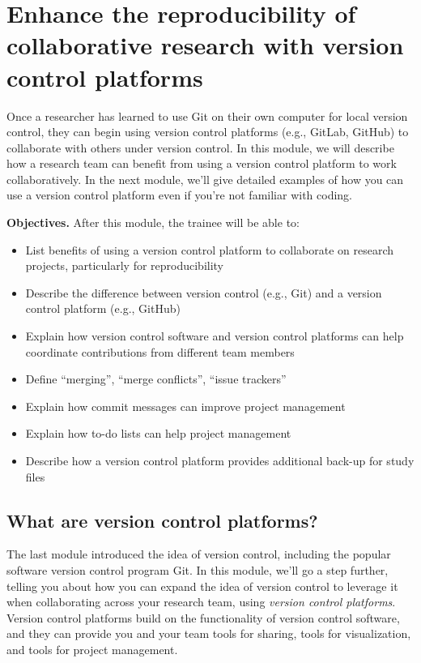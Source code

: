 \documentclass[]{tufte-book}
\providecommand{\tightlist}{%
  \setlength{\itemsep}{0pt}\setlength{\parskip}{0pt}}
\begin{document}
\section{Enhance the reproducibility of collaborative research with version control platforms}\label{module10}

Once a researcher has learned to use Git on their own computer for local version
control, they can begin using version control platforms (e.g., GitLab, GitHub)
to collaborate with others under version control. In this module, we will
describe how a research team can benefit from using a version control platform
to work collaboratively. In the next module, we'll give detailed examples
of how you can use a version control platform even if you're not familiar with
coding.

\textbf{Objectives.} After this module, the trainee will be able to:

\begin{itemize}
\tightlist
\item
  List benefits of using a version control platform to collaborate
  on research projects, particularly for reproducibility
\item
  Describe the difference between version control (e.g., Git) and
  a version control platform (e.g., GitHub)
\item
  Explain how version control software and version control platforms can
  help coordinate contributions from different team members
\item
  Define ``merging'', ``merge conflicts'', ``issue trackers''
\item
  Explain how commit messages can improve project management
\item
  Explain how to-do lists can help project management
\item
  Describe how a version control platform provides additional back-up for
  study files
\end{itemize}

\subsection{What are version control platforms?}\label{what-are-version-control-platforms}

The last module introduced the idea of version control, including the popular
software version control program Git. In this module, we'll go a
step further, telling you about how you can expand the idea of version control
to leverage it when collaborating across your research team, using \emph{version
control platforms}. Version control platforms build on the functionality of
version control software, and they can provide you and your team tools
for sharing, tools for visualization, and tools for project management.
\end{document}
